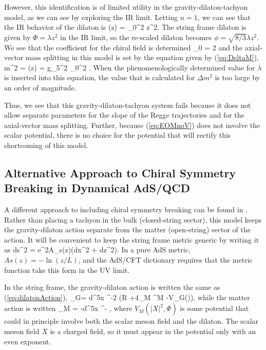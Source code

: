 However, this identification is of limited utility in the gravity-dilaton-tachyon model, as we can see by exploring the IR limit.
Letting $n=1$, we can see that the IR behavior of the dilaton is 
\be
\phi(z) = \chi_0^2 z^2.
\ee
The string frame dilaton is given by $\Phi = \lambda z^2$ in the IR limit, so the re-scaled dilaton becomes $\phi = \sqrt{8/3}\lambda z^2$.
We see that the coefficient for the chiral field is determined
\be
\chi_0 = 2 \sqrt{\lambda}
\ee
and the axial-vector mass splitting in this model is set by the equation given by (\ref{eq:DeltaM}),
\be
\Delta m^2 = (z\rightarrow \infty) = g_5^2 \chi_0^2 .
\ee
When the phenomenologically determined value for $\lambda$ is inserted into this equation, the value that is calculated for $\Delta m^2$ is too large by an order of magnitude. 

Thus, we see that this gravity-dilaton-tachyon system fails because it does not allow separate parameters for the slope of the Regge trajectories and for the axial-vector mass splitting.
Further, because (\ref{eq:EOMnoV}) does not involve the scalar potential, there is no choice for the potential that will rectify this shortcoming of this model. 

\subsection{Alternative Approach to Chiral Symmetry Breaking in Dynamical AdS/QCD}

A different approach to including chiral symmetry breaking can be found in \cite{Li2013,Li2013a}. 
Rather than placing a tachyon in the bulk (closed-string sector), this model keeps the gravity-dilaton action separate from the matter (open-string) sector of the action.
It will be convenient to keep the string frame metric generic by writing it as 
\be
ds^2 = e^{2A_s(z)}(dx^2 + dz^2).
\ee
In a pure AdS metric, $As(z)=-\ln(z/L)$, and the AdS/CFT dictionary requires that the metric function take this form in the UV limit.

In the string frame, the gravity-dilaton action is written the same as (\ref{eq:dilatonAction}),
\be
{}_G=  \int d^5x \root \EXP^{-2\Phi} \left(R +4\partial_M \Phi \partial^M \Phi -V_G(\Phi)\right), 
\label{eq:altGravAction}
\ee
while the matter action is written
\be
{}_M  = -\int d^5x \root \EXP^{-\Phi}  ,
\label{eq:altMatterAction}
\ee
where $V_M(|X|^2,\Phi)$ is some potential that could in principle involve both the scalar meson field and the dilaton.
The scalar meson field $X$ is a charged field, so it must  appear in the potential only with an even exponent.

